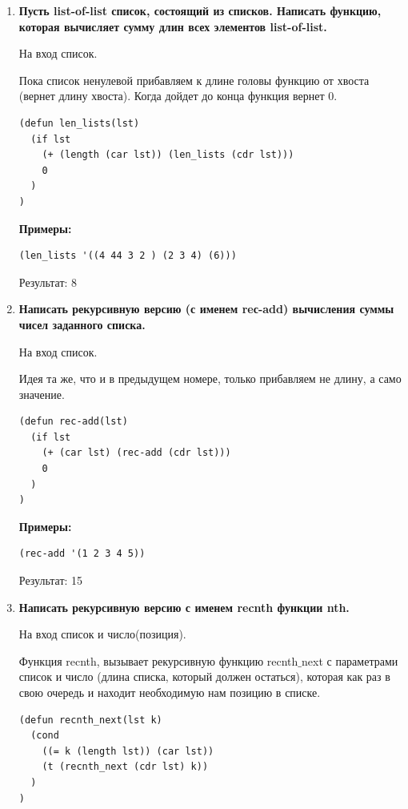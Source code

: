 \documentclass[a4paper,14pt]{extreport} %
\begin{document}
\begin{enumerate}
\item \textbf{Пусть list-of-list список, состоящий из списков. Написать функцию, которая вычисляет сумму длин всех элементов list-of-list.}

На вход список. 

Пока список ненулевой прибавляем к длине головы функцию от хвоста (вернет длину хвоста). Когда дойдет до конца функция вернет 0. 

\begin{lstlisting}
(defun len_lists(lst)
  (if lst
    (+ (length (car lst)) (len_lists (cdr lst)))
    0
  )
)
\end{lstlisting}

\textbf{Примеры:}

\begin{lstlisting}
(len_lists '((4 44 3 2 ) (2 3 4) (6)))
\end{lstlisting}

Результат: 8

\item \textbf{Написать рекурсивную версию (с именем reс-add) вычисления суммы чисел заданного списка.}

На вход список. 

Идея та же, что и в предыдущем номере, только прибавляем не длину, а само значение. 

\begin{lstlisting}
(defun rec-add(lst)
  (if lst
    (+ (car lst) (rec-add (cdr lst)))
    0
  )
)
\end{lstlisting}

\textbf{Примеры: }

\begin{lstlisting}
(rec-add '(1 2 3 4 5))
\end{lstlisting}

Результат: 15

\item \textbf{Написать рекурсивную версию с именем recnth функции nth.}

На вход список и число(позиция). 

Функция recnth, вызывает рекурсивную функцию recnth$\_$next с параметрами список и число (длина списка, который должен остаться), которая как раз в свою очередь и находит необходимую нам позицию в списке. 

\begin{lstlisting}
(defun recnth_next(lst k)
  (cond
    ((= k (length lst)) (car lst))
    (t (recnth_next (cdr lst) k))
  )
)


\end{lstlisting}
\end{enumerate}
\end{document}
